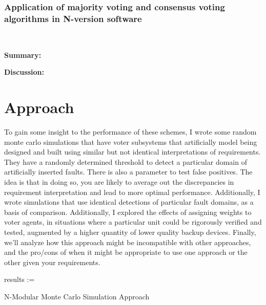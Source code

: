 \documentclass[article]{IEEEtran}
\begin{document}
\subsubsection{Application of majority voting and consensus voting algorithms in N-version software}
\cite{Tsarev_2018}
\hfill\\
\par
\textbf{Summary:} 
\par
\textbf{Discussion:}

\section{Approach}
To gain some insight to the performance of these schemes, I wrote some random monte carlo simulations that have voter subsystems that artificially model being designed and built using similar but not identical interpretations of requirements. They have a randomly determined threshold to detect a particular domain of artificially inserted faults. There is also a parameter to test false positives. The idea is that in doing so, you are likely to average out the discrepancies in requirement interpretation and lead to more optimal performance. Additionally, I wrote simulations that use identical detections of particular fault domains, as a basis of comparison.  Additionally, I explored the effects of assigning weights to voter agents, in situations where a particular unit could be rigorously verified and tested, augmented by a higher quantity of lower quality backup devices. Finally, we'll analyze how this approach might be incompatible with other approaches, and the pro/cons of when it might be appropriate to use one approach or the other given your requirements. 

\begin{algorithm}
    results := 
    \caption{N-Modular Monte Carlo Simulation Approach}
\end{algorithm}
\end{document}

